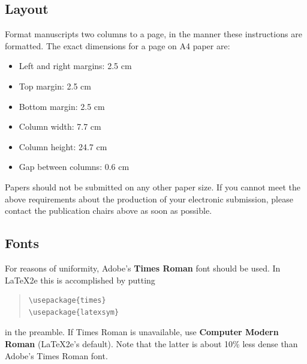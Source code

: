 \documentclass[11pt,a4paper]{article}
\begin{document}
\subsection{Layout}
\label{ssec:layout}

Format manuscripts two columns to a page, in the manner these
instructions are formatted. The exact dimensions for a page on A4
paper are:

\begin{itemize}
\item Left and right margins: 2.5 cm
\item Top margin: 2.5 cm
\item Bottom margin: 2.5 cm
\item Column width: 7.7 cm
\item Column height: 24.7 cm
\item Gap between columns: 0.6 cm
\end{itemize}

\noindent Papers should not be submitted on any other paper size.
 If you cannot meet the above requirements about the production of 
 your electronic submission, please contact the publication chairs 
 above as soon as possible.

\subsection{Fonts}

For reasons of uniformity, Adobe's \textbf{Times Roman} font should be
used. In \LaTeX2e{} this is accomplished by putting

\begin{quote}
\begin{verbatim}
\usepackage{times}
\usepackage{latexsym}
\end{verbatim}
\end{quote}
in the preamble. If Times Roman is unavailable, use \textbf{Computer
  Modern Roman} (\LaTeX2e{}'s default).  Note that the latter is about
  10\% less dense than Adobe's Times Roman font.
\end{document}
